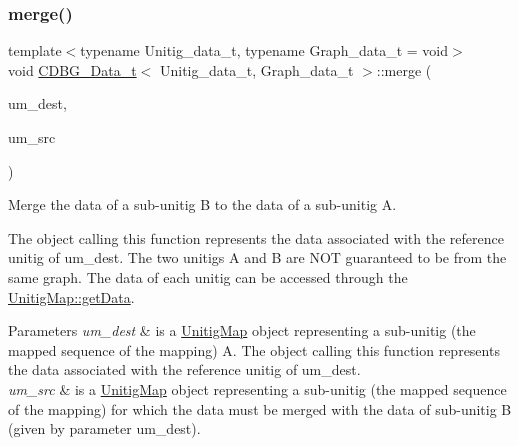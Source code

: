 \subsubsection{\texorpdfstring{merge()}{merge()}}
{\footnotesize\ttfamily template$<$typename Unitig\+\_\+data\+\_\+t, typename Graph\+\_\+data\+\_\+t = void$>$ \\
void \hyperlink{classCDBG__Data__t}{C\+D\+B\+G\+\_\+\+Data\+\_\+t}$<$ Unitig\+\_\+data\+\_\+t, Graph\+\_\+data\+\_\+t $>$\+::merge (\begin{DoxyParamCaption}\item[{const \hyperlink{classUnitigMap}{Unitig\+Map}$<$ Unitig\+\_\+data\+\_\+t, Graph\+\_\+data\+\_\+t $>$ \&}]{um\+\_\+dest,  }\item[{const \hyperlink{CompactedDBG_8hpp_a631369597e56604279ba89a211c14fd0}{const\+\_\+\+Unitig\+Map}$<$ Unitig\+\_\+data\+\_\+t, Graph\+\_\+data\+\_\+t $>$ \&}]{um\+\_\+src }\end{DoxyParamCaption})\hspace{0.3cm}{\ttfamily [inline]}}



Merge the data of a sub-\/unitig B to the data of a sub-\/unitig A. 

The object calling this function represents the data associated with the reference unitig of um\+\_\+dest. The two unitigs A and B are N\+OT guaranteed to be from the same graph. The data of each unitig can be accessed through the \hyperlink{classUnitigMap_a0c40fd1ba2df6af9a0c55b7963e41493}{Unitig\+Map\+::get\+Data}. 
\begin{DoxyParams}{Parameters}
{\em um\+\_\+dest} & is a \hyperlink{classUnitigMap}{Unitig\+Map} object representing a sub-\/unitig (the mapped sequence of the mapping) A. The object calling this function represents the data associated with the reference unitig of um\+\_\+dest. \\
\hline
{\em um\+\_\+src} & is a \hyperlink{classUnitigMap}{Unitig\+Map} object representing a sub-\/unitig (the mapped sequence of the mapping) for which the data must be merged with the data of sub-\/unitig B (given by parameter um\+\_\+dest). \\
\hline
\end{DoxyParams}
\mbox{\label{classCDBG__Data__t_a4c6ec7ef1a4ca46bd643f59d25730945}} 
